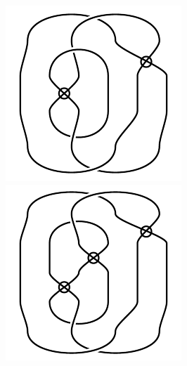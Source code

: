 \begin{figure}[H]
\begin{minipage}[b]{.18\linewidth}
\centering
\includegraphics[width=\linewidth]{../data/virtual_4_2.png}
\end{minipage}
\begin{minipage}[b]{.18\linewidth}
\centering
\includegraphics[width=\linewidth]{../data/virtual_4_3.png}

\end{minipage}
\end{figure}
